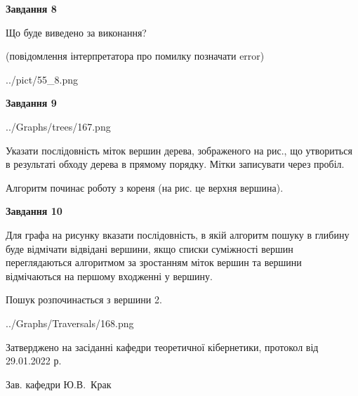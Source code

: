 \documentclass[12pt, ukrainian]{article}
\begin{document}
{\begin {large}
{\begin {center}\textbf{Завдання 8}\end {center}}\par
Що буде виведено за виконання?\par
 (повідомлення інтерпретатора про помилку позначати error)\par
\begin{center}
	{../pict/55_8.png}
\end{center}
\newpage

{\begin {center}\textbf{Завдання 9}\end {center}}\par

\begin{center}
	{../Graphs/trees/167.png}
\end{center}
Указати послідовність міток вершин дерева, зображеного на рис., що утвориться в результаті обходу дерева в прямому порядку. Мітки записувати через пробіл.\par Алгоритм починає роботу з кореня (на рис. це верхня вершина).\par
\newpage

{\begin {center}\textbf{Завдання 10}\end {center}}\par
Для графа на рисунку вказати послідовність, в якій алгоритм пошуку в глибину буде відмічати відвідані вершини, якщо списки суміжності вершин переглядаються алгоритмом за зростанням міток вершин та вершини відмічаються на першому вход\-женні у вершину.\par
Пошук розпочинається з вершини 2.\par

\begin{center}
	{../Graphs/Traversals/168.png}
\end{center}\par
\newpage


\end {large}
}
{\smallskip \begin {small} Затверджено на засіданні кафедри теоретичної кібернетики, протокол  від   29.01.2022 р.\par\smallskip\smallskip
{\parbox {6.5 cm}{Зав. кафедри \dotfill Ю.В.~Крак}} \end{small}}
\end{document}
